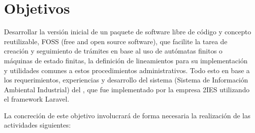 \section{Objetivos}

Desarrollar la versión inicial de un paquete de software libre de código y
concepto reutilizable, FOSS (free and open source software), que facilite la
tarea de creación y seguimiento de trámites en base al uso de autómatas finitos
o máquinas de estado finitas, la definición de lineamientos para su
implementación y utilidades comunes a estos procedimientos administrativos. Todo
esto en base a los requerimientos, experiencias y desarrollo del sistema
 (Sistema de Información Ambiental Industrial) del , que fue implementado por la empresa
2IES utilizando el framework Laravel.

La concreción de este objetivo involucrará de forma necesaria la realización de
las actividades siguientes:

